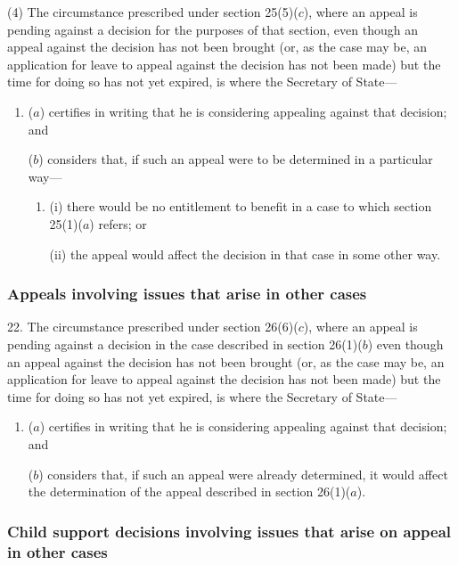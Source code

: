 \documentclass[12pt,a4paper]{article}
\begin{document}
(4) The circumstance prescribed under section 25(5)($c$), where an appeal is pending against a decision for the purposes of that section, even though an appeal against the decision has not been brought (or, as the case may be, an application for leave to appeal against the decision has not been made) but the time for doing so has not yet expired, is where the Secretary of State—
\begin{enumerate}\item[]
($a$) certifies in writing that he is considering appealing against that decision; and

($b$) considers that, if such an appeal were to be determined in a particular way—
\begin{enumerate}\item[]
(i) there would be no entitlement to benefit in a case to which section 25(1)($a$) refers; or

(ii) the appeal would affect the decision in that case in some other way.
\end{enumerate}
\end{enumerate}

\subsubsection[22. Appeals involving issues that arise in other cases]{Appeals involving issues that arise in other cases}

22.  The circumstance prescribed under section 26(6)($c$), where an appeal is pending against a decision in the case described in section 26(1)($b$) even though an appeal against the decision has not been brought (or, as the case may be, an application for leave to appeal against the decision has not been made) but the time for doing so has not yet expired, is where the Secretary of State—
\begin{enumerate}\item[]
($a$) certifies in writing that he is considering appealing against that decision; and

($b$) considers that, if such an appeal were already determined, it would affect the determination of the appeal described in section 26(1)($a$).
\end{enumerate}

\subsubsection[23. Child support decisions involving issues that arise on appeal in other cases]{Child support decisions involving issues that arise on appeal in other cases}
\end{document}
